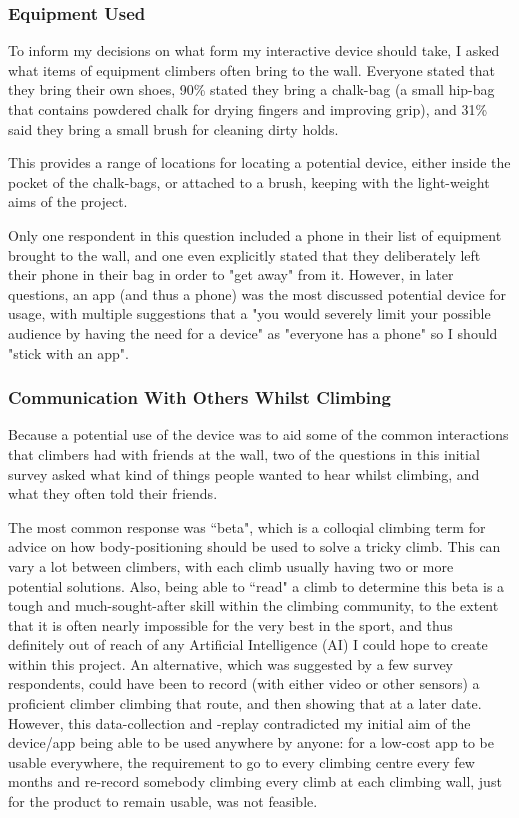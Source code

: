 \subsubsection{Equipment Used}
To inform my decisions on what form my interactive device should take, I asked what items of equipment climbers often bring to the wall.
Everyone stated that they bring their own shoes, 90\% stated they bring a chalk-bag (a small hip-bag that contains powdered chalk for drying fingers and improving grip), and 31\% said they bring a small brush for cleaning dirty holds.

This provides a range of locations for locating a potential device, either inside the pocket of the chalk-bags, or attached to a brush, keeping with the light-weight aims of the project.

Only one respondent in this question included a phone in their list of equipment brought to the wall, and one even explicitly stated that they deliberately left their phone in their bag in order to "get away" from it. 
However, in later questions, an app (and thus a phone) was the most discussed potential device for usage, with multiple suggestions that a "you would severely limit your possible audience by having the need for a device" as "everyone has a phone" so I should "stick with an app".



\subsubsection{Communication With Others Whilst Climbing}
Because a potential use of the device was to aid some of the common interactions that climbers had with friends at the wall, two of the questions in this initial survey asked what kind of things people wanted to hear whilst climbing, and what they often told their friends.

The most common response was ``beta", which is a colloqial climbing term for advice on how body-positioning should be used to solve a tricky climb. 
This can vary a lot between climbers, with each climb usually having two or more potential solutions.
Also, being able to ``read" a climb to determine this beta is a tough and much-sought-after skill within the climbing community, to the extent that it is often nearly impossible for the very best in the sport, and thus definitely out of reach of any Artificial Intelligence (AI) I could hope to create within this project.
An alternative, which was suggested by a few survey respondents, could have been to record (with either video or other sensors) a proficient climber climbing that route, and then showing that at a later date. 
However, this data-collection and -replay contradicted my initial aim of the device/app being able to be used anywhere by anyone: for a low-cost app to be usable everywhere, the requirement to go to every climbing centre every few months and re-record somebody climbing every climb at each climbing wall, just for the product to remain usable, was not feasible.

